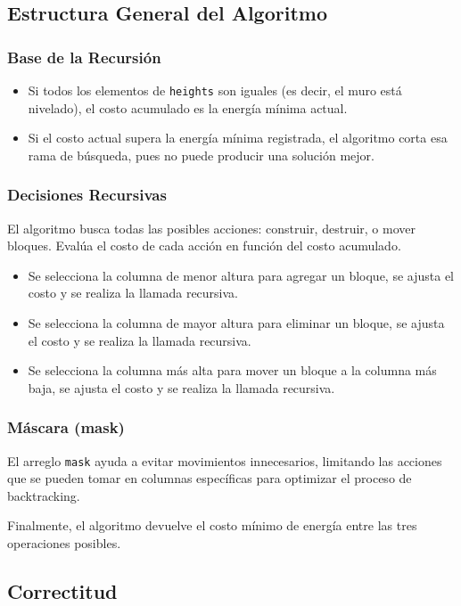 \documentclass[a4paper,12pt]{article}
\begin{document}
\subsection{Estructura General del Algoritmo}

\subsubsection{Base de la Recursión}
\begin{itemize}
	\item Si todos los elementos de \texttt{heights} son iguales (es decir, el muro está nivelado), el costo acumulado es la energía mínima actual.
	\item Si el costo actual supera la energía mínima registrada, el algoritmo corta esa rama de búsqueda, pues no puede producir una solución mejor.
\end{itemize}

\subsubsection{Decisiones Recursivas}
El algoritmo busca todas las posibles acciones: construir, destruir, o mover bloques. Evalúa el costo de cada acción en función del costo acumulado.
\begin{itemize}
	\item Se selecciona la columna de menor altura para agregar un bloque, se ajusta el costo y se realiza la llamada recursiva.
	\item Se selecciona la columna de mayor altura para eliminar un bloque, se ajusta el costo y se realiza la llamada recursiva.
	\item Se selecciona la columna más alta para mover un bloque a la columna más baja, se ajusta el costo y se realiza la llamada recursiva.
\end{itemize}

\subsubsection{Máscara (mask)}
El arreglo \texttt{mask} ayuda a evitar movimientos innecesarios, limitando las acciones que se pueden tomar en columnas específicas para optimizar el proceso de backtracking.

Finalmente, el algoritmo devuelve el costo mínimo de energía entre las tres operaciones posibles.

\subsection{Correctitud}
\end{document}
